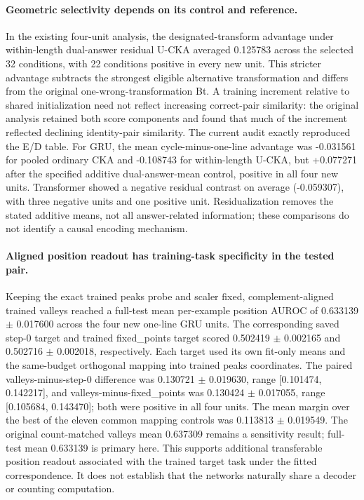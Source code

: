 \paragraph{Geometric selectivity depends on its control and reference.} In the existing four-unit analysis, the designated-transform advantage under within-length dual-answer residual U-CKA averaged 0.125783 across the selected 32 conditions, with 22 conditions positive in every new unit. This stricter advantage subtracts the strongest eligible alternative transformation and differs from the original one-wrong-transformation Bt. A training increment relative to shared initialization need not reflect increasing correct-pair similarity: the original analysis retained both score components and found that much of the increment reflected declining identity-pair similarity. The current audit exactly reproduced the E/D table. For GRU, the mean cycle-minus-one-line advantage was -0.031561 for pooled ordinary CKA and -0.108743 for within-length U-CKA, but +0.077271 after the specified additive dual-answer-mean control, positive in all four new units. Transformer showed a negative residual contrast on average (-0.059307), with three negative units and one positive unit. Residualization removes the stated additive means, not all answer-related information; these comparisons do not identify a causal encoding mechanism.

\paragraph{Aligned position readout has training-task specificity in the tested pair.} Keeping the exact trained peaks probe and scaler fixed, complement-aligned trained valleys reached a full-test mean per-example position AUROC of 0.633139  $\pm$  0.017600 across the four new one-line GRU units. The corresponding saved step-0 target and trained fixed\_points target scored 0.502419  $\pm$  0.002165 and 0.502716  $\pm$  0.002018, respectively. Each target used its own fit-only means and the same-budget orthogonal mapping into trained peaks coordinates. The paired valleys-minus-step-0 difference was 0.130721  $\pm$  0.019630, range [0.101474, 0.142217], and valleys-minus-fixed\_points was 0.130424  $\pm$  0.017055, range [0.105684, 0.143470]; both were positive in all four units. The mean margin over the best of the eleven common mapping controls was 0.113813  $\pm$  0.019549. The original count-matched valleys mean 0.637309 remains a sensitivity result; full-test mean 0.633139 is primary here. This supports additional transferable position readout associated with the trained target task under the fitted correspondence. It does not establish that the networks naturally share a decoder or counting computation.

